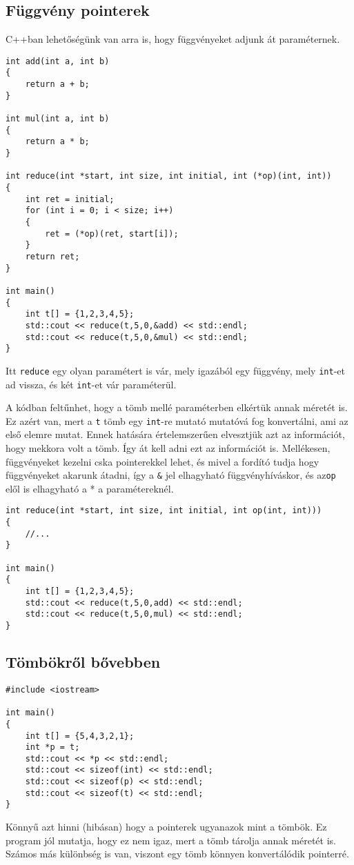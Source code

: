 \documentclass[a4paper,11.5pt]{article}
\begin{document}
	\subsection{Függvény pointerek}
	C++ban lehetőségünk van arra is, hogy függvényeket adjunk át paraméternek.
		\begin{lstlisting}
int add(int a, int b)
{
	return a + b;
}

int mul(int a, int b)
{
	return a * b;
}

int reduce(int *start, int size, int initial, int (*op)(int, int))
{
	int ret = initial;
	for (int i = 0; i < size; i++)
	{
		ret = (*op)(ret, start[i]);
	}
	return ret;
}

int main()
{
	int t[] = {1,2,3,4,5};
	std::cout << reduce(t,5,0,&add) << std::endl;
	std::cout << reduce(t,5,0,&mul) << std::endl;
}
		\end{lstlisting}
		
		Itt \texttt{reduce} egy olyan paramétert is vár, mely igazából egy függvény, mely \texttt{int}-et ad vissza, és két \texttt{int}-et vár paraméterül.
		\medskip
		
		A kódban feltűnhet, hogy a tömb mellé paraméterben elkértük annak méretét is. Ez azért van, mert a \texttt{t} tömb egy \texttt{int}-re mutató mutatóvá fog konvertálni, ami az első elemre mutat. Ennek hatására értelemszerűen elvesztjük azt az információt, hogy mekkora volt a tömb. Így át kell adni ezt az információt is. Mellékesen, függvényeket kezelni cska pointerekkel lehet, és mivel a fordító tudja hogy függvényeket akarunk átadni, így a \texttt{\&} jel elhagyható függvényhíváskor, és az\texttt{op} elől is elhagyható a * a paramétereknél.
		\begin{lstlisting}
int reduce(int *start, int size, int initial, int op(int, int)))
{
	//...
}

int main()
{
	int t[] = {1,2,3,4,5};
	std::cout << reduce(t,5,0,add) << std::endl;
	std::cout << reduce(t,5,0,mul) << std::endl;
}
		\end{lstlisting}
	\subsection{Tömbökről bővebben}
		\begin{lstlisting}
#include <iostream>

int main()
{
	int t[] = {5,4,3,2,1};
	int *p = t;
	std::cout << *p << std::endl;
	std::cout << sizeof(int) << std::endl;
	std::cout << sizeof(p) << std::endl;
	std::cout << sizeof(t) << std::endl;
}
		\end{lstlisting}
		Könnyű azt hinni (hibásan) hogy a pointerek ugyanazok mint a tömbök. Ez  program jól mutatja, hogy ez nem igaz, mert a tömb tárolja annak méretét is. Számos más különbség is van, viszont egy tömb könnyen konvertálódik pointerré.
		
\end{document}
